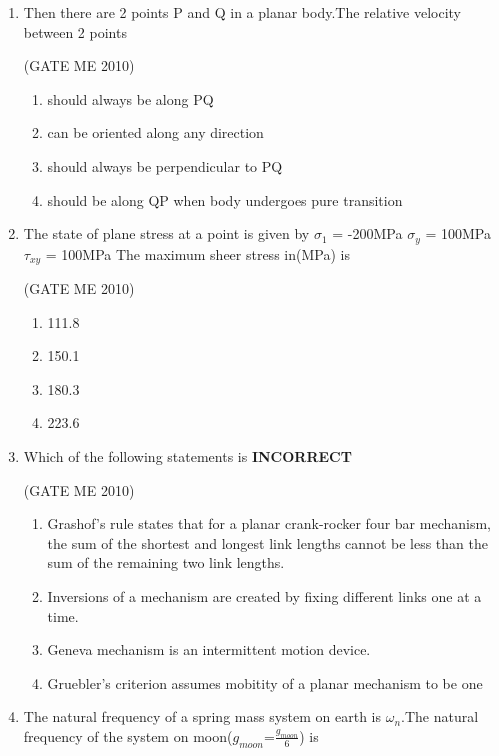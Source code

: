\documentclass[journal,12pt,onecolumn]{IEEEtran}
\theoremstyle{remark}
\begin{document}
\begin{enumerate}
\item  Then there are 2 points P and Q in a planar body.The relative velocity between 2 points


 \hfill{(GATE ME 2010)}
\begin{enumerate}
\item  should always be along PQ
\item  can be oriented along any direction 
\item  should always be perpendicular to PQ
\item should be along QP when body undergoes pure transition

\end{enumerate}
 

\item The state of plane stress at a point is given by $\sigma_{1}$ = -200MPa  $\sigma_{y}$ = 100MPa $\tau_{xy}$ = 100MPa The maximum sheer stress in(MPa) is 

 \hfill{(GATE ME 2010)}
\begin{multicols}{4}
\begin{enumerate}
\item 111.8
\item 150.1
\item 180.3
\item 223.6
\end{enumerate}
\end{multicols}


\item Which of the following statements is \textbf{INCORRECT}

 \hfill{(GATE ME 2010)}
 
\begin{enumerate}
\item Grashof's rule states that for a planar crank-rocker four bar mechanism, the sum of the shortest and longest link lengths cannot be less than the sum of the remaining  two link lengths.
\item Inversions of a mechanism are created by fixing different links one at a time.
\item Geneva mechanism is an intermittent motion device.
\item Gruebler's criterion assumes mobitity of a planar mechanism to be one
\end{enumerate}
 


\item The natural frequency of a spring mass system on earth is $\omega_{n}$.The natural frequency of the system on moon($g_{moon}$=$\frac{g_{moon}}{6}$) is


\end{enumerate}
\end{document}
